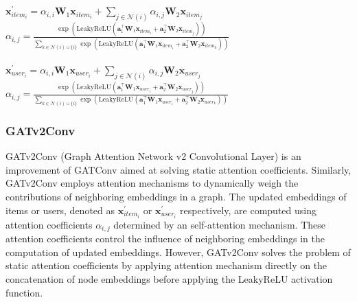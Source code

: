 \documentclass[bst/sn-nature]{sn-jnl}
\begin{document}
\begin{multicols}{2}
\begin{center}
    $\mathbf{x}^{\prime}_{item_{i}} = \alpha_{i,i}\mathbf{W}_{1}\mathbf{x}_{item_{i}} + \sum_{j \in \mathcal{N}(i)} \alpha_{i,j}\mathbf{W}_{2}\mathbf{x}_{item_{j}}$\\
    $\alpha_{i,j} =
    \frac{
    \exp\left(\mathrm{LeakyReLU}\left(
    \mathbf{a}^{\top}_{1} \mathbf{W}_{1}\mathbf{x}_{item_{i}}
    + \mathbf{a}^{\top}_{2} \mathbf{W}_{2}\mathbf{x}_{item_{j}}
    \right)\right)}
    {\sum_{k \in \mathcal{N}(i) \cup \{ i \}}
    \exp\left(\mathrm{LeakyReLU}\left(
    \mathbf{a}^{\top}_{1} \mathbf{W}_{1}\mathbf{x}_{item_{i}}
    + \mathbf{a}^{\top}_{2}\mathbf{W}_{2}\mathbf{x}_{item_{k}}
    \right)\right)}$ \\~\\
    $\mathbf{x}^{\prime}_{user_{i}} = \alpha_{i,i}\mathbf{W}_{1}\mathbf{x}_{user_{i}} + \sum_{j \in \mathcal{N}(i)} \alpha_{i,j}\mathbf{W}_{2}\mathbf{x}_{user_{j}}$\\
    $\alpha_{i,j} =
    \frac{
    \exp\left(\mathrm{LeakyReLU}\left(
    \mathbf{a}^{\top}_{1} \mathbf{W}_{1}\mathbf{x}_{user_{i}}
    + \mathbf{a}^{\top}_{2} \mathbf{W}_{2}\mathbf{x}_{user_{j}}
    \right)\right)}
    {\sum_{k \in \mathcal{N}(i) \cup \{ i \}}
    \exp\left(\mathrm{LeakyReLU}\left(
    \mathbf{a}^{\top}_{1} \mathbf{W}_{1}\mathbf{x}_{user_{i}}
    + \mathbf{a}^{\top}_{2}\mathbf{W}_{2}\mathbf{x}_{user_{k}}
    \right)\right)}$
\end{center}

\subsubsection{GATv2Conv\cite{gatv2conv}} 

\quad GATv2Conv (Graph Attention Network v2 Convolutional Layer) is an improvement of GATConv aimed at solving static attention coefficients. Similarly, GATv2Conv employs attention mechanisms to dynamically weigh the contributions of neighboring embeddings in a graph. The updated embeddings of items or users, denoted as $\mathbf{x}^{\prime}_{item_i}$ or $\mathbf{x}^{\prime}_{user_i}$ respectively, are computed using attention coefficients $\alpha_{i,j}$ determined by an self-attention mechanism. These attention coefficients control the influence of neighboring embeddings in the computation of updated embeddings. However, GATv2Conv solves the problem of static attention coefficients by applying attention mechanism directly on the concatenation of node embeddings before applying the LeakyReLU activation function. \\


\end{multicols}
\end{document}
